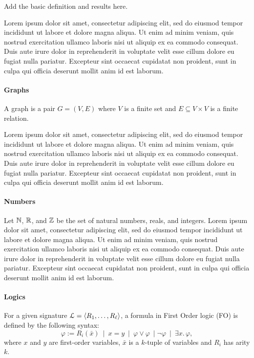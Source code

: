 
Add the basic definition and results here. 

Lorem ipsum dolor sit amet, consectetur adipiscing elit, sed do eiusmod tempor incididunt ut labore et dolore magna aliqua. Ut enim ad minim veniam, quis nostrud exercitation ullamco laboris nisi ut aliquip ex ea commodo consequat. Duis aute irure dolor in reprehenderit in voluptate velit esse cillum dolore eu fugiat nulla pariatur. Excepteur sint occaecat cupidatat non proident, sunt in culpa qui officia deserunt mollit anim id est laborum.

\paragraph{Graphs} A graph is a pair $G = (V, E)$ where $V$ is a finite set and $E \subseteq V\times V$ is a finite relation.


Lorem ipsum dolor sit amet, consectetur adipiscing elit, sed do eiusmod tempor incididunt ut labore et dolore magna aliqua. Ut enim ad minim veniam, quis nostrud exercitation ullamco laboris nisi ut aliquip ex ea commodo consequat. Duis aute irure dolor in reprehenderit in voluptate velit esse cillum dolore eu fugiat nulla pariatur. Excepteur sint occaecat cupidatat non proident, sunt in culpa qui officia deserunt mollit anim id est laborum.

\paragraph{Numbers} Let $\mathbb{N}$, $\mathbb{R}$, and $\mathbb{Z}$ be the set of natural numbers, reals, and integers.
Lorem ipsum dolor sit amet, consectetur adipiscing elit, sed do eiusmod tempor incididunt ut labore et dolore magna aliqua. Ut enim ad minim veniam, quis nostrud exercitation ullamco laboris nisi ut aliquip ex ea commodo consequat. Duis aute irure dolor in reprehenderit in voluptate velit esse cillum dolore eu fugiat nulla pariatur. Excepteur sint occaecat cupidatat non proident, sunt in culpa qui officia deserunt mollit anim id est laborum.

\paragraph{Logics} For a given signature $\mathcal{L} = \langle R_1,\ldots,R_{\ell}\rangle$, a formula in First Order logic (FO) is defined by the following syntax:
$$
\varphi := R_i(\bar{x}) \ \mid \ x = y \ \mid \ \varphi \vee \varphi \ \mid \neg \varphi \ \mid \ \exists x.\, \varphi,
$$
where $x$ and $y$ are first-order variables, $\bar{x}$ is a $k$-tuple of variables and $R_i$ has arity $k$.
